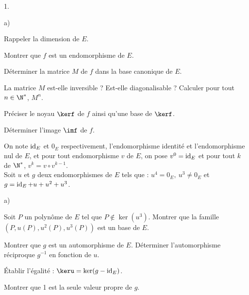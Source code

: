 \documentclass[11pt]{article}%
\begin{document}
\begin{noliste}{1.}
 \setlength{\itemsep}{4mm}

\item \begin{noliste}{a)}
 \setlength{\itemsep}{2mm}

\item Rappeler la dimension de $E$. \\

\item Montrer que $f$ est un endomorphisme de $E$. \\

\item Déterminer la matrice $M$ de $f$ dans la base canonique de $E$.
\\

\item La matrice $M$ est-elle inversible ? Est-elle diagonalisable ?
Calculer pour tout $n \in \N^{\ast}$, $M^{n}$. \\

\item Préciser le noyau $\kerf$ de $f$ ainsi qu'une base de $\kerf$. \\

\item Déterminer l'image $\imf$ de $f$. \\

\end{noliste}

\item On note $\operatorname{id}_{E}$ et $0_{E}$ respectivement, l'endomorphisme
identité et l'endomorphisme nul de $E$, et pour tout endomorphisme $v$
de $E$, on pose $v^{0} = \operatorname{id}_{E}$ et pour tout $k$ de $\N^{\ast}$,
$v^{k} = v \circ v^{k-1}$. \\
Soit $u$ et $g$ deux endomorphismes de $E$ tels que : $u^{4} = 0_{E}, \
u^{3} \neq 0_{E}$ et $g = \operatorname{id}_{E} + u + u^{2} + u^{3}$.

\begin{noliste}{a)}
 \setlength{\itemsep}{2mm}

\item Soit $P$ un polynôme de $E$ tel que $P \notin \ker(u^{3})$.
Montrer que la famille $( P, u(P), u^{2}(P), u^{3}(P) )$ est un base de
$E$. \\

\item Montrer que $g$ est un automorphisme de $E$. Déterminer
l'automorphisme réciproque $g^{-1}$ en fonction de $u$. \\

\item Établir l'égalité : $\keru = \ker(g-\id_{E})$. \\

\item Montrer que 1 est la seule valeur propre de $g$. \\

\end{noliste}

\end{noliste}
\end{document}
